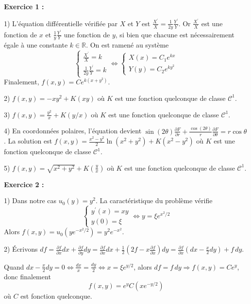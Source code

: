 \documentclass[12pt]{article}
\newcounter{exercice}
\begin{document}
\begin{corrige}[title=Corrigé des exercices]
\textbf{Exercice 1 :}

1) L'équation différentielle vérifiée par $X$ et $Y$ est $\frac{X^{\prime}}{X} = \frac{1}{2y} \frac{Y^{\prime}}{Y}$. Or $\frac{X^{\prime}}{X}$ est une fonction de $x$ et $\frac{1}{y} \frac{Y^{\prime}}{Y}$ une fonction de $y$, si bien que chacune est nécessairement égale à une constante $k \in \mathbb{R}$. On est ramené au système
$$
\left\{\begin{array}{l}
\frac{X^{\prime}}{X} = k \\
\frac{1}{2y} \frac{Y^{\prime}}{Y} = k
\end{array} \Longleftrightarrow \left\{\begin{array}{l}
X(x) = C_{1} e^{kx} \\
Y(y) = C_{2} e^{ky^{2}}
\end{array}\right.\right.
$$
Finalement, $f(x, y) = C e^{k\left(x+y^{2}\right)}$.

2) $f(x, y) = -xy^{2} + K(xy)$ où $K$ est une fonction quelconque de classe $\mathcal{C}^{1}$.

3) $f(x, y) = \frac{y^{2}}{x} + K(y/x)$ où $K$ est une fonction quelconque de classe $\mathcal{C}^{1}$.

4) En coordonnées polaires, l'équation devient $\sin(2\theta)\frac{\partial F}{\partial r} + \frac{\cos(2\theta)}{r}\frac{\partial F}{\partial \theta} = r\cos\theta$. La solution est $f(x, y) = \frac{x^2-y^2}{2}\ln(x^2+y^2) + K(x^2-y^2)$ où $K$ est une fonction quelconque de classe $\mathcal{C}^{1}$.

5) $f(x, y) = \sqrt{x^{2}+y^{2}} + K\left(\frac{y}{x}\right)$ où $K$ est une fonction quelconque de classe $\mathcal{C}^{1}$.

\textbf{Exercice 2 :}

1) Dans notre cas $u_{0}(y) = y^{2}$. La caractéristique du problème vérifie
$$
\left\{\begin{array}{l}
y^{\prime}(x) = xy \\
y(0) = \xi
\end{array} \Longleftrightarrow y = \xi e^{x^{2}/2}\right.
$$
Alors $f(x, y) = u_{0}\left(y e^{-x^{2}/2}\right) = y^{2} e^{-x^{2}}$.

2) Écrivons $df = \frac{\partial f}{\partial x} dx + \frac{\partial f}{\partial y} dy = \frac{\partial f}{\partial x} dx + \frac{1}{2}\left(2f - x \frac{\partial f}{\partial x}\right) dy = \frac{\partial f}{\partial x}\left(dx - \frac{x}{2} dy\right) + f\, dy$.

Quand $dx - \frac{x}{2} dy = 0 \Longleftrightarrow \frac{dx}{x} = \frac{dy}{2} \Longleftrightarrow x = \xi e^{y/2}$, alors $df = f\, dy \Longrightarrow f(x, y) = C e^{y}$, donc finalement
$$
f(x, y) = e^{y} C\left(x e^{-y/2}\right)
$$
où $C$ est fonction quelconque.
\end{corrige}
\end{document}
